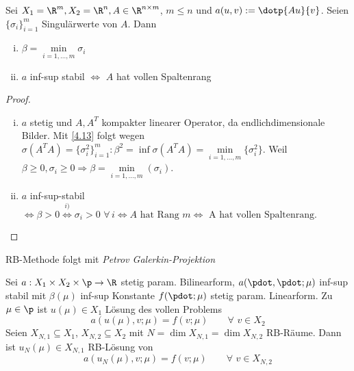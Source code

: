 \begin{kor}
Sei $X_1 = \R^m, X_2 = \R^n, A \in \R^{n \times m}$, $m \leq n$ und $a(u,v) := \dotp{Au}{v}$. Seien $\{\sigma_i\}_{i=1}^m$ Singulärwerte von $A$. Dann
\begin{enumerate}[i)]
	\item $\beta = \min\limits_{i=1,\dots,m} \sigma_i$
	\item $a$ inf-sup stabil $\iff$ $A$ hat vollen Spaltenrang
\end{enumerate}
\begin{proof}
\begin{enumerate}[i)]
	\item $a$ stetig und $A, A^T$ kompakter linearer Operator, da endlichdimensionale  Bilder. Mit \ref{4.13} folgt wegen $\sigma(A^TA) = \{\sigma_i^2\}_{i=1}^m : \beta^2 = \inf \sigma(A^TA) = \min\limits_{i=1,\dots,m} \{\sigma_i^2\}$. Weil $\beta \geq 0, \sigma_i \geq 0 \Rightarrow \beta = \min\limits_{i=1,\dots,m} (\sigma_i)$.
	\item $a$ inf-sup-stabil $\iff \beta > 0 \overset{i)}{\iff} \sigma_i > 0 \,\, \forall \, i \iff A \text{ hat Rang } m \iff \text{ A hat vollen Spaltenrang.}$
\end{enumerate}
\end{proof}
\end{kor}

RB-Methode folgt mit \emph{Petrov Galerkin-Projektion}

\begin{defn} \label{4.15}
Sei $a: X_1 \times X_2 \times \p \rightarrow \R$ stetig param. Bilinearform, $a(\pdot,\pdot;\mu)$ inf-sup stabil mit $\beta(\mu)$ inf-sup Konstante $f(\pdot;\mu)$ stetig param. Linearform. Zu $\mu \in \p$ ist $u(\mu) \in X_1$ Lösung des vollen Problems
\[
	a(u(\mu),v;\mu) = f(v;\mu) \qquad \forall \,\, v \in X_2
\]
Seien $X_{N,1} \subseteq X_1$, $X_{N,2} \subseteq X_2$ mit $N = \dim X_{N,1} = \dim X_{N,2}$ RB-Räume. Dann ist $u_N (\mu) \in X_{N,1}$ RB-Lösung von
\[
	a(u_N(\mu),v;\mu) = f(v;\mu) \qquad \forall \,\, v \in X_{N,2}
\]
\end{defn}

